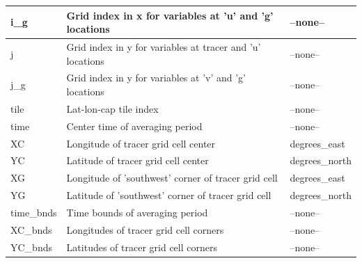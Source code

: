 \begin{longtable}{|m{}|m{}|m{}|}
i\_g &Grid index in x for variables at 'u' and 'g' locations &--none--  \\ \hline
j &Grid index in y for variables at tracer and 'u' locations &--none--  \\ \hline
j\_g &Grid index in y for variables at 'v' and 'g' locations &--none--  \\ \hline
tile &Lat-lon-cap tile index &--none--  \\ \hline
time &Center time of averaging period &--none--  \\ \hline
XC &Longitude of tracer grid cell center &degrees\_east  \\ \hline
YC &Latitude of tracer grid cell center &degrees\_north  \\ \hline
XG &Longitude of 'southwest' corner of tracer grid cell &degrees\_east  \\ \hline
YG &Latitude of 'southwest' corner of tracer grid cell &degrees\_north  \\ \hline
time\_bnds &Time bounds of averaging period &--none--  \\ \hline
XC\_bnds &Longitudes of tracer grid cell corners &--none--  \\ \hline
YC\_bnds &Latitudes of tracer grid cell corners &--none--  \\ \hline
\end{longtable}

\newp
\pagebreak
